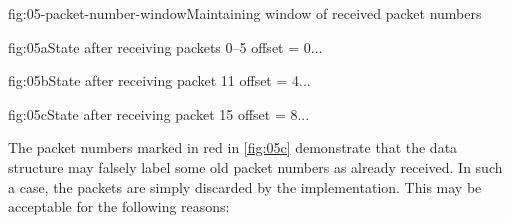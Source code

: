 \begin{myFigure}{fig:05-packet-number-window}{Maintaining window of received packet numbers}

  \begin{mySubfigure}{\textwidth}{fig:05a}{State after receiving packets 0--5}
    offset = 0\hspace{1cm}...
  \end{mySubfigure}

  \medskip

  \begin{mySubfigure}{\textwidth}{fig:05b}{State after receiving packet 11}
    offset = 4\hspace{1cm}...
  \end{mySubfigure}

  \medskip

  \begin{mySubfigure}{\textwidth}{fig:05c}{State after receiving packet 15}
    offset = 8\hspace{1cm}...
  \end{mySubfigure}

\end{myFigure}

\setlength{\fboxsep}{\origframesep}

The packet numbers marked in red in \autoref{fig:05c} demonstrate that the data structure may
falsely label some old packet numbers as already received. In such a case, the packets are simply
discarded by the \ManagedQuicConnection{} implementation. This may be acceptable for the following
reasons:

